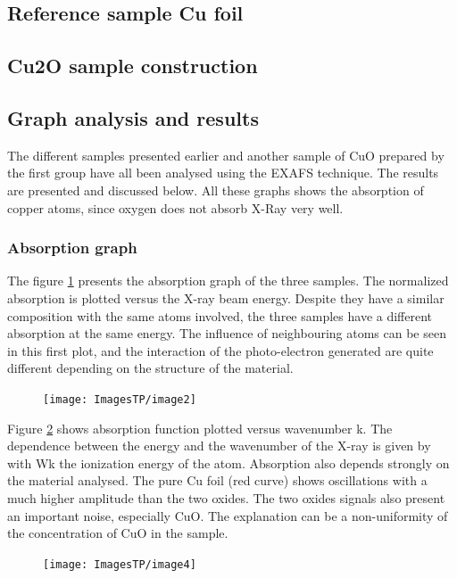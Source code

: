 \documentclass[11pt,a4paper,oneside]{article}
\begin{document}
\subsection{Reference sample Cu foil}


\subsection{Cu2O sample construction}


\subsection{Graph analysis and results} \label{results}
The different samples presented earlier and another sample of CuO prepared by the first group have all been analysed using the EXAFS technique. The results are presented and discussed below. All these graphs shows the absorption of copper atoms, since oxygen does not absorb X-Ray very well.

\subsubsection{Absorption graph}
The figure \ref{graph1} presents the absorption graph of the three samples. The normalized absorption is plotted versus the X-ray beam energy. Despite they have a similar composition with the same atoms involved, the three samples have a different absorption at the same energy. The influence of neighbouring atoms can be seen in this first plot, and the interaction of the photo-electron generated are quite different depending on the structure of the material.
\begin{figure}[h]
    \begin{center}
        \texttt{[image: ImagesTP/image2]}
        \caption{}
        \label{graph1}
    \end{center}
\end{figure}

Figure \ref{graph2} shows absorption function plotted versus wavenumber k. The dependence between the energy and the wavenumber of the X-ray is given by   with Wk the ionization energy of the atom.
Absorption also depends strongly on the material analysed. The pure Cu foil (red curve) shows oscillations with a much higher amplitude than the two oxides. The two oxides signals also present an important noise, especially CuO. The explanation can be a non-uniformity of the concentration of CuO in the sample.
\begin{figure}[h]
    \begin{center}
        \texttt{[image: ImagesTP/image4]}
        \caption{}
        \label{graph2}
    \end{center}
\end{figure}
\end{document}
